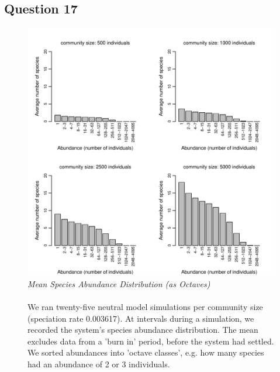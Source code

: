 \documentclass[11pt]{article}
\begin{document}
\subsection*{Question 17}
\begin{figure}[h]
\centering
\includegraphics[width=0.8\linewidth]{../Results/Question_17.pdf}
\caption{\emph{Mean Species Abundance Distribution (as Octaves)}\\\\
We ran twenty-five neutral model simulations per community size (speciation rate 0.003617). At intervals during a simulation, we recorded the system's species abundance distribution. The mean excludes data from a 'burn in' period, before the system had settled. We sorted abundances into 'octave classes', e.g. how many species had an abundance of 2 or 3 individuals.}
\end{figure}

\end{document}
